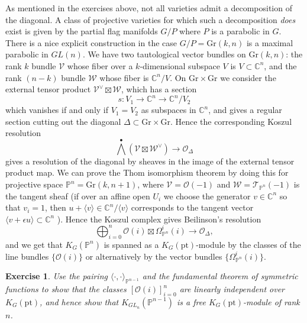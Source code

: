 \documentclass[11pt]{amsart}
\newtheorem{exercise}[dummy]{Exercise}
\theoremstyle{definition}
\newcommand{\bP}{\mathbb{P}}
\newcommand{\Gr}{\mathrm{Gr}}
\newcommand{\Oc}{\mathcal{O}}
\numberwithin{equation}{subsection}
\numberwithin{figure}{subsection}
\newcommand{\pt}{\mathrm{pt}}
\begin{document}
As mentioned in the exercises above, not all varieties admit a decomposition of the diagonal.  A class of projective varieties for which such a decomposition \emph{does} exist is given by the partial flag manifolds $G/P$ where $P$ is a parabolic in $G$. There is a nice explicit construction in the case $G/P=\Gr(k,n)$ is a maximal parabolic in $GL(n)$. We have two tautological vector bundles on $\Gr(k,n)$: the rank $k$ bundle $\mathcal{V}$ whose fiber over a $k$-dimensional subspace $V$ is $V\subset \mathbb{C}^n$, and the rank $(n-k)$ bundle $\mathcal{W}$ whose fiber is $\mathbb{C}^n/V$. On $\Gr\times \Gr$ we consider the external tensor product $\mathcal{V}^\vee\boxtimes\mathcal{W}$, which has a section
$$
s: V_1\rightarrow \mathbb{C}^n\rightarrow \mathbb{C}^n/V_2
$$
which vanishes if and only if $V_1=V_2$ as subspaces in $\mathbb{C}^n$, and gives a regular section cutting out the diagonal $\Delta\subset \Gr\times\Gr$. Hence the corresponding Koszul resolution
$$
\bigwedge^\bullet\left(\mathcal{V}\boxtimes\mathcal{W}^\vee\right)\rightarrow\mathcal{O}_\Delta
$$
gives a resolution of the diagonal by sheaves in the image of the external tensor product map. We can prove the Thom isomorphism theorem by doing this for projective space $\bP^n=\Gr(k,n+1)$, where $\mathcal{V}=\mathcal{O}(-1)$ and $\mathcal{W}=\mathcal{T}_{\bP^n}(-1)$ is the tangent sheaf (if over an affine open $U_i$ we choose the generator $v\in\mathbb{C}^n$ so that $v_i=1$, then $u+ \langle v\rangle \in \mathbb{C}^n /\langle v\rangle$ corresponds to the tangent vector $\langle v+\epsilon u\rangle\subset\mathbb{C}^n$ ). Hence the Koszul complex gives Beilinson's resolution
$$
\bigoplus_{i=0}^n \mathcal{O}(i)\boxtimes\Omega_{\bP^n}^i(i)\rightarrow \mathcal{O}_{\Delta},
$$
and we get that $K_G(\bP^n)$ is spanned as a $K_G(\pt)$-module by the classes of the line bundles $\{\Oc(i)\}$ or alternatively by the vector bundles $\{\Omega_{\bP^n}^i(i)\}$.
\begin{exercise}
\label{ex:gram}
Use the pairing $\langle\cdot,\cdot\rangle_{\bP^{n-1}}$ and the fundamental theorem of symmetric functions to show that the classes $[\Oc(i)]_{i=0}^n$ are linearly independent over $K_G(\pt)$, and hence show that $K_{GL_{n}}(\bP^{n-1})$ is a free $K_G(\pt)$-module of rank $n$.
\end{exercise}
\end{document}
